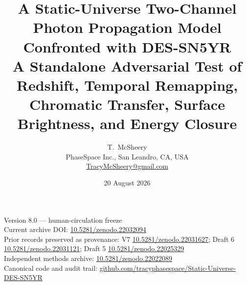\documentclass[11pt]{article}
\title{A Static-Universe Two-Channel Photon Propagation Model Confronted with DES-SN5YR\\
\large A Standalone Adversarial Test of Redshift, Temporal Remapping, Chromatic Transfer, Surface Brightness, and Energy Closure}
\author{T.~McSheery\\
\small PhaseSpace Inc., San Leandro, CA, USA\\
\small \href{mailto:TracyMcSheery@gmail.com}{TracyMcSheery@gmail.com}}
\date{20 August 2026}
\newcommand{\methodsdoi}{10.5281/zenodo.22022089}
\newcommand{\draftfivedoi}{10.5281/zenodo.22025329}
\newcommand{\draftsixdoi}{10.5281/zenodo.22031121}
\newcommand{\vsevendoi}{10.5281/zenodo.22031627}
\newcommand{\veightdoi}{10.5281/zenodo.22032094}
\begin{document}
\maketitle

\begin{center}
\small
Version 8.0 --- human-circulation freeze\\
Current archive DOI: \href{https://doi.org/\veightdoi}{\veightdoi}\\
Prior records preserved as provenance: V7 \href{https://doi.org/\vsevendoi}{\vsevendoi}; Draft 6 \href{https://doi.org/\draftsixdoi}{\draftsixdoi}; Draft 5 \href{https://doi.org/\draftfivedoi}{\draftfivedoi}\\
Independent methods archive: \href{https://doi.org/\methodsdoi}{\methodsdoi}\\
Canonical code and audit trail: \href{https://github.com/tracyphasespace/Static-Universe-DES-SN5YR}{github.com/tracyphasespace/Static-Universe-DES-SN5YR}
\end{center}
\end{document}
